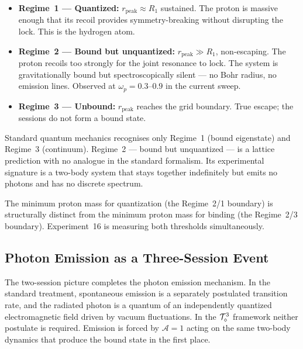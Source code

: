 \begin{itemize}
    \item \textbf{Regime~1 --- Quantized:} $r_\text{peak} \approx R_1$
    sustained.  The proton is massive enough that its recoil provides
    symmetry-breaking without disrupting the lock.  This is the hydrogen
    atom.

    \item \textbf{Regime~2 --- Bound but unquantized:}
    $r_\text{peak} \gg R_1$, non-escaping.  The proton recoils too
    strongly for the joint resonance to lock.  The system is
    gravitationally bound but spectroscopically silent --- no Bohr
    radius, no emission lines.  Observed at $\omega_p = 0.3$--$0.9$
    in the current sweep.

    \item \textbf{Regime~3 --- Unbound:} $r_\text{peak}$ reaches the
    grid boundary.  True escape; the sessions do not form a bound state.
\end{itemize}

Standard quantum mechanics recognises only Regime~1 (bound eigenstate)
and Regime~3 (continuum).
Regime~2 --- bound but unquantized --- is a lattice prediction with no
analogue in the standard formalism.
Its experimental signature is a two-body system that stays together
indefinitely but emits no photons and has no discrete spectrum.

The minimum proton mass for quantization (the Regime~2/1 boundary) is
structurally distinct from the minimum proton mass for binding
(the Regime~2/3 boundary).
Experiment~16 is measuring both thresholds simultaneously.

\subsection{Photon Emission as a Three-Session Event}
\label{subsec:emission}

The two-session picture completes the photon emission mechanism.
In the standard treatment, spontaneous emission is a separately
postulated transition rate, and the radiated photon is a quantum of
an independently quantized electromagnetic field driven by vacuum
fluctuations.
In the $\mathcal{T}_\diamond^3$ framework neither postulate is required.
Emission is forced by $\mathcal{A}=1$ acting on the same two-body
dynamics that produce the bound state in the first place.

